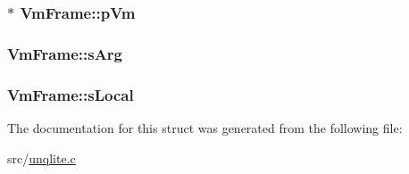 \hypertarget{struct_vm_frame_afa8136e5cdb713195f04b7d1bbe0463f}{
\subsubsection[{p\-Vm}]{$\ast$ Vm\-Frame\-::p\-Vm}}\label{de/d1c/struct_vm_frame_afa8136e5cdb713195f04b7d1bbe0463f}
\hypertarget{struct_vm_frame_a8be304d99997d2077ed486f699e9b0b3}{
\subsubsection[{s\-Arg}]{ Vm\-Frame\-::s\-Arg}}\label{de/d1c/struct_vm_frame_a8be304d99997d2077ed486f699e9b0b3}
\hypertarget{struct_vm_frame_adb499e1c681646d5f57fbe17edb8d338}{
\subsubsection[{s\-Local}]{ Vm\-Frame\-::s\-Local}}\label{de/d1c/struct_vm_frame_adb499e1c681646d5f57fbe17edb8d338}


The documentation for this struct was generated from the following file\-:\begin{DoxyCompactItemize}
\item 
src/\hyperlink{unqlite_8c}{unqlite.\-c}\end{DoxyCompactItemize}
